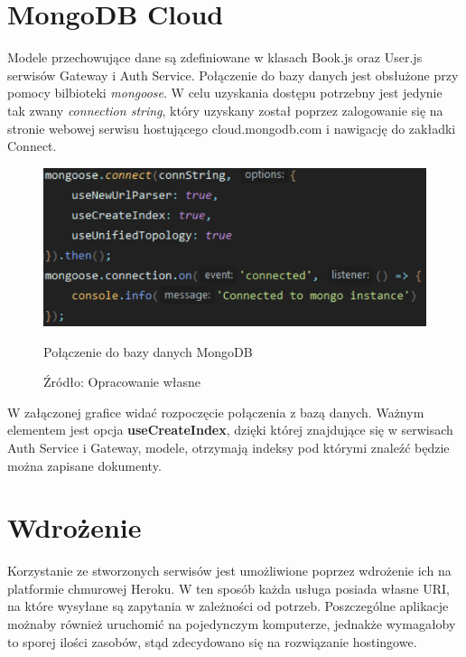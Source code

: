 \newpage
\section{MongoDB Cloud}
Modele przechowujące dane są zdefiniowane w klasach Book.js oraz User.js serwisów Gateway i Auth Service. Połączenie do bazy danych jest obsłużone przy pomocy bilbioteki \textit{mongoose}.\newline
W celu uzyskania dostępu potrzebny jest jedynie tak zwany \textit{connection string}, który uzyskany został poprzez zalogowanie się na stronie webowej serwisu hostującego cloud.mongodb.com i nawigację do zakładki Connect.
\begin{figure}[H]
	\centering
	\includegraphics[width=\linewidth]{mongo.pdf}
	\caption{\centering Połączenie do bazy danych MongoDB}
	\caption*{\centering Źródło: {Opracowanie własne}}
\end{figure}
W załączonej grafice widać rozpoczęcie połączenia z bazą danych. Ważnym elementem jest opcja \textbf{useCreateIndex}, dzięki której znajdujące się w serwisach Auth Service i Gateway, modele, otrzymają indeksy pod którymi znaleźć będzie można zapisane dokumenty. 


\section{Wdrożenie}

Korzystanie ze stworzonych serwisów jest umożliwione poprzez wdrożenie ich na platformie chmurowej Heroku.
W ten sposób każda usługa posiada własne URI, na które wysyłane są zapytania w zależności od potrzeb.
Poszczególne aplikacje możnaby również uruchomić na pojedynczym komputerze, jednakże wymagałoby to sporej ilości zasobów, stąd zdecydowano się na rozwiązanie hostingowe.

